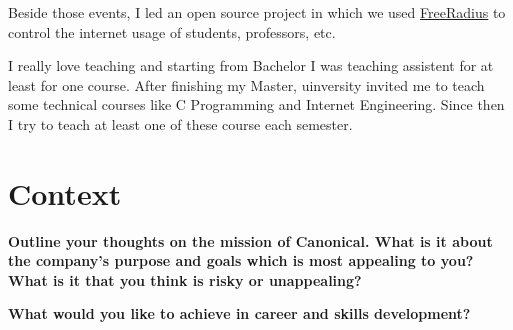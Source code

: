 Beside those events, I led an open source project in which we used \href{https://freeradius.org/}{FreeRadius}
to control the internet usage of students, professors, etc.

I really love teaching and starting from Bachelor I was teaching assistent for at least for one course.
After finishing my Master, uinversity invited me to teach some technical courses like C Programming and
Internet Engineering. Since then I try to teach at least one of these course each semester.

\section{Context}

\noindent
\textbf{Outline your thoughts on the mission of Canonical. What is it about the company's purpose and goals which is most appealing to you? What is it that you think is risky or unappealing?}

\noindent
\textbf{What would you like to achieve in career and skills development?}
